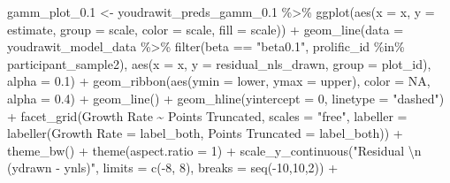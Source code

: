 \documentclass[print]{nuthesis}
\newenvironment{Shaded}{\begin{snugshade}}{\end{snugshade}}
\newcommand{\AttributeTok}[1]{\textcolor[rgb]{0.77,0.63,0.00}{#1}}
\newcommand{\ConstantTok}[1]{\textcolor[rgb]{0.00,0.00,0.00}{#1}}
\newcommand{\DecValTok}[1]{\textcolor[rgb]{0.00,0.00,0.81}{#1}}
\newcommand{\FloatTok}[1]{\textcolor[rgb]{0.00,0.00,0.81}{#1}}
\newcommand{\FunctionTok}[1]{\textcolor[rgb]{0.00,0.00,0.00}{#1}}
\newcommand{\NormalTok}[1]{#1}
\newcommand{\OtherTok}[1]{\textcolor[rgb]{0.56,0.35,0.01}{#1}}
\newcommand{\SpecialCharTok}[1]{\textcolor[rgb]{0.00,0.00,0.00}{#1}}
\newcommand{\StringTok}[1]{\textcolor[rgb]{0.31,0.60,0.02}{#1}}
\begin{document}
\begin{Shaded}
\begin{Highlighting}[]
\NormalTok{gamm\_plot\_0}\FloatTok{.1} \OtherTok{\textless{}{-}}\NormalTok{ youdrawit\_preds\_gamm\_0}\FloatTok{.1} \SpecialCharTok{\%\textgreater{}\%}
  \FunctionTok{ggplot}\NormalTok{(}\FunctionTok{aes}\NormalTok{(}\AttributeTok{x =}\NormalTok{ x, }\AttributeTok{y =}\NormalTok{ estimate, }\AttributeTok{group =}\NormalTok{ scale, }\AttributeTok{color =}\NormalTok{ scale, }\AttributeTok{fill =}\NormalTok{ scale)) }\SpecialCharTok{+}
  \FunctionTok{geom\_line}\NormalTok{(}\AttributeTok{data =}\NormalTok{ youdrawit\_model\_data }\SpecialCharTok{\%\textgreater{}\%} 
              \FunctionTok{filter}\NormalTok{(beta }\SpecialCharTok{==} \StringTok{"beta0.1"}\NormalTok{, prolific\_id }\SpecialCharTok{\%in\%}\NormalTok{ participant\_sample2), }
            \FunctionTok{aes}\NormalTok{(}\AttributeTok{x =}\NormalTok{ x, }\AttributeTok{y =}\NormalTok{ residual\_nls\_drawn, }\AttributeTok{group =}\NormalTok{ plot\_id), }\AttributeTok{alpha =} \FloatTok{0.1}\NormalTok{) }\SpecialCharTok{+}
  \FunctionTok{geom\_ribbon}\NormalTok{(}\FunctionTok{aes}\NormalTok{(}\AttributeTok{ymin =}\NormalTok{ lower, }\AttributeTok{ymax =}\NormalTok{ upper), }\AttributeTok{color =} \ConstantTok{NA}\NormalTok{, }\AttributeTok{alpha =} \FloatTok{0.4}\NormalTok{) }\SpecialCharTok{+}
  \FunctionTok{geom\_line}\NormalTok{() }\SpecialCharTok{+}
  \FunctionTok{geom\_hline}\NormalTok{(}\AttributeTok{yintercept =} \DecValTok{0}\NormalTok{, }\AttributeTok{linetype =} \StringTok{"dashed"}\NormalTok{) }\SpecialCharTok{+}
  \FunctionTok{facet\_grid}\NormalTok{(}\StringTok{\textasciigrave{}}\AttributeTok{Growth Rate}\StringTok{\textasciigrave{}} \SpecialCharTok{\textasciitilde{}} \StringTok{\textasciigrave{}}\AttributeTok{Points Truncated}\StringTok{\textasciigrave{}}\NormalTok{, }\AttributeTok{scales =} \StringTok{"free"}\NormalTok{, }\AttributeTok{labeller =} \FunctionTok{labeller}\NormalTok{(}\StringTok{\textasciigrave{}}\AttributeTok{Growth Rate}\StringTok{\textasciigrave{}} \OtherTok{=}\NormalTok{ label\_both, }\StringTok{\textasciigrave{}}\AttributeTok{Points Truncated}\StringTok{\textasciigrave{}} \OtherTok{=}\NormalTok{ label\_both)) }\SpecialCharTok{+}
  \FunctionTok{theme\_bw}\NormalTok{() }\SpecialCharTok{+}
  \FunctionTok{theme}\NormalTok{(}\AttributeTok{aspect.ratio =} \DecValTok{1}\NormalTok{) }\SpecialCharTok{+}
  \FunctionTok{scale\_y\_continuous}\NormalTok{(}\StringTok{"Residual }\SpecialCharTok{\textbackslash{}n}\StringTok{ (ydrawn {-} ynls)"}\NormalTok{, }\AttributeTok{limits =} \FunctionTok{c}\NormalTok{(}\SpecialCharTok{{-}}\DecValTok{8}\NormalTok{, }\DecValTok{8}\NormalTok{), }\AttributeTok{breaks =} \FunctionTok{seq}\NormalTok{(}\SpecialCharTok{{-}}\DecValTok{10}\NormalTok{,}\DecValTok{10}\NormalTok{,}\DecValTok{2}\NormalTok{)) }\SpecialCharTok{+}

\end{Highlighting}
\end{Shaded}
\end{document}
